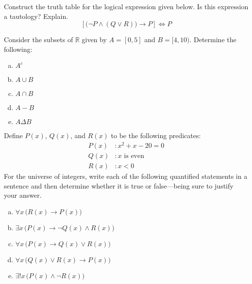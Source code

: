 \documentclass[12pt,letterpaper]{exam}
\begin{document}
\examtitle
{} 
\scores
\bottomline
\newpage

\begin{questions}

\newpage
\question[10] Construct the truth table for the logical expression given below. Is this expression a tautology? Explain. 
	\[
	\left[ \big( \neg P \wedge (Q \vee R) \big) \to P \right] \Longleftrightarrow P
	\]



\newpage
\question[10] Consider the subsets of $\mathbb{R}$ given by $A= [0, 5]$ and $B= [4, 10)$. Determine the following:
	\begin{enumerate}[(a)]
	\item $A^c$
	\item $A \cup B$
	\item $A \cap B$
	\item $A - B$
	\item $A \Delta B$
	\end{enumerate}



\newpage
\question[10] Define $P(x)$, $Q(x)$, and $R(x)$ to be the following predicates:
	\[
	\begin{aligned}
	P(x)&: x^2 + x - 20= 0 \\
	Q(x)&: x \text{ is even} \\
	R(x)&: x < 0
	\end{aligned}
	\]
For the universe of integers, write each of the following quantified statements in a sentence and then determine whether it is true or false---being sure to justify your answer.
	\begin{enumerate}[(a)]
	\item $\forall x\, \big( R(x) \to P(x) \big)$
	\item $\exists x\, \big( P(x) \to \neg Q(x) \wedge R(x) \big)$
	\item $\forall x\, \big( P(x) \to Q(x) \vee R(x) \big)$
	\item $\forall x\, \big( Q(x) \vee R(x) \to P(x) \big)$
	\item $\exists! x\, \big( P(x) \wedge \neg R(x) \big)$
	\end{enumerate}




\end{questions}
\end{document}
